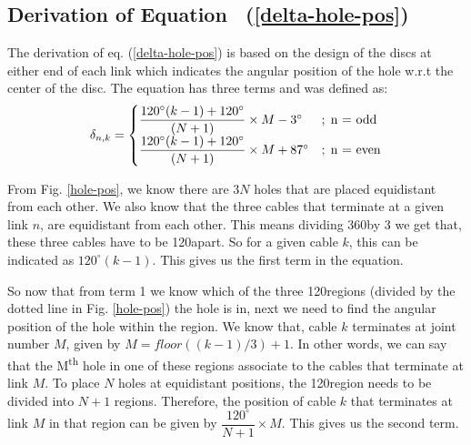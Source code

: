 \documentclass[a4paper,12pt]{report}
\begin{document}
\begin{appendices}
	\section{Derivation of Equation ~(\ref{delta-hole-pos})}
	
	The derivation of eq. (\ref{delta-hole-pos}) is based on the design of the discs at either end of each link which indicates the angular position of the hole w.r.t the center of the disc. The equation has three terms and was defined as:
	\begin{equation}
	\delta_{n,k} =
	\begin{cases}
	\dfrac{120^{\circ}(k-1)+120^{\circ}}{(N+1)} \times M - 3^{\circ} &; \hspace{1mm}  \text{n = odd}   \\
	\dfrac{120^{\circ}(k-1)+120^{\circ}}{(N+1)} \times M+ 87^{\circ} &; \hspace{1mm}  \text{n = even}
	\end{cases}
	\end{equation}
	
	From Fig. \ref{hole-pos}, we know there are $ 3N $ holes that are placed equidistant from each other. We also know that the three cables that terminate at a given link $ n $, are equidistant from each other. This means dividing 360\textdegree by 3 we get that, these three cables have to be 120\textdegree apart. So for a given cable $ k $, this can be indicated as $ 120^\circ(k-1) $. This gives us the first term in the equation.
	
	So now that from term 1 we know which of the three 120\textdegree regions (divided by the dotted line in Fig. \ref{hole-pos}) the hole is in, next we need to find the angular position of the hole within the region. We know that, cable $ k $ terminates at joint number $ M $, given by $M=floor((k-1)/3)+1$. In other words, we can say that the M\textsuperscript{th} hole in one of these regions associate to the cables that terminate at link $ M $. To place $ N $ holes at equidistant positions, the 120\textdegree region needs to be divided into $ N+1 $ regions. Therefore, the position of cable $ k $ that terminates at link $ M $ in that region can be given by $ \dfrac{120^\circ}{N+1}\times M$. This gives us the second term.
	

\end{appendices}
\end{document}
